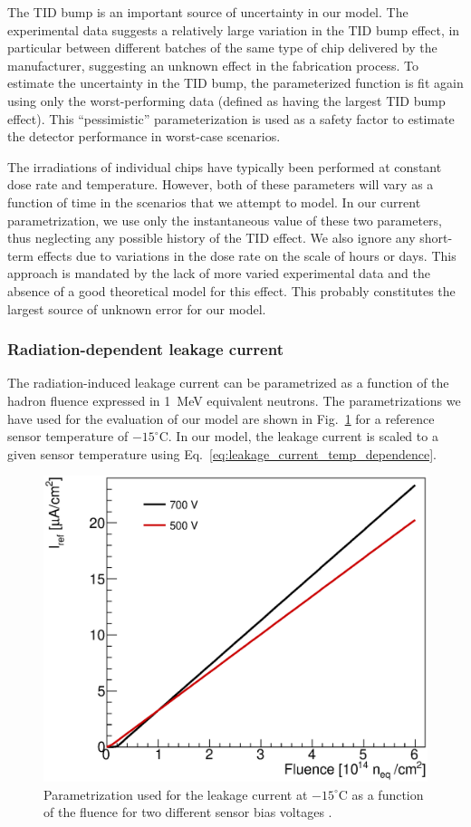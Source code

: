 The TID bump is an important source of uncertainty in our model. The experimental data suggests
a relatively large variation in the TID bump effect, in particular
between different batches of the same type of chip delivered by the manufacturer, suggesting an unknown
effect in the fabrication process. To estimate the uncertainty in the TID bump,
the parameterized function is fit again using only the worst-performing data (defined as having the
largest TID bump effect). This ``pessimistic'' parameterization is used as a safety factor to estimate
the detector performance in worst-case scenarios.

The irradiations of individual chips have typically been performed at constant dose rate and temperature.
However, both of these parameters will vary as a function of time in the scenarios that we attempt to model.
In our current parametrization, we use only the instantaneous value of these two parameters, thus neglecting any possible history of the TID effect. We also ignore any short-term effects due to variations in the dose rate on the scale of hours or days. This approach is mandated by the lack of more varied experimental data and the absence of a good theoretical model for this effect. This probably constitutes the largest source of unknown error for our model.

\subsubsection{Radiation-dependent leakage current}

The radiation-induced leakage current can be parametrized as a function of the hadron fluence expressed in 1~MeV equivalent neutrons. The parametrizations we have used for the evaluation of our model are shown in Fig.~\ref{fig:leakage} for a reference sensor temperature of $-15^\circ$C. In our model, the leakage current is scaled to a given sensor temperature using Eq.~\ref{eq:leakage_current_temp_dependence}.

\begin{figure}[ht]
\centering
\includegraphics[width=0.45\linewidth]{figures/SensorLeakagePower.eps}
\caption{Parametrization used for the leakage current at $-15^\circ$C as a function of the fluence for two different sensor bias voltages \cite{mikestikova}.}
\label{fig:leakage}
\end{figure}

